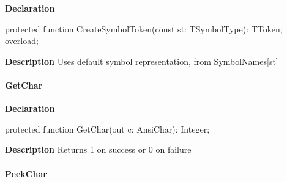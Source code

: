 \documentclass{report}
\newif\ifpdf
\begin{document}
\label{PasDoc_Tokenizer.TTokenizer-CreateSymbolToken}
\begin{list}{}{
\setlength{\itemindent}{0cm}
\setlength{\listparindent}{0cm}
\setlength{\leftmargin}{\evensidemargin}
\addtolength{\leftmargin}{\tmplength}
\settowidth{\labelsep}{X}
\addtolength{\leftmargin}{\labelsep}
\setlength{\labelwidth}{\tmplength}
}
\item[\textbf{Declaration}\hfill]
\ifpdf
\begin{flushleft}
\fi
\begin{ttfamily}
protected function CreateSymbolToken(const st: TSymbolType): TToken; overload;\end{ttfamily}

\ifpdf
\end{flushleft}
\fi

\par
\item[\textbf{Description}]
Uses default symbol representation, from SymbolNames[st]

\end{list}
\paragraph*{GetChar}\hspace*{\fill}

\label{PasDoc_Tokenizer.TTokenizer-GetChar}
\begin{list}{}{
\setlength{\itemindent}{0cm}
\setlength{\listparindent}{0cm}
\setlength{\leftmargin}{\evensidemargin}
\addtolength{\leftmargin}{\tmplength}
\settowidth{\labelsep}{X}
\addtolength{\leftmargin}{\labelsep}
\setlength{\labelwidth}{\tmplength}
}
\item[\textbf{Declaration}\hfill]
\ifpdf
\begin{flushleft}
\fi
\begin{ttfamily}
protected function GetChar(out c: AnsiChar): Integer;\end{ttfamily}

\ifpdf
\end{flushleft}
\fi

\par
\item[\textbf{Description}]
Returns 1 on success or 0 on failure

\end{list}
\paragraph*{PeekChar}\hspace*{\fill}
\end{document}
